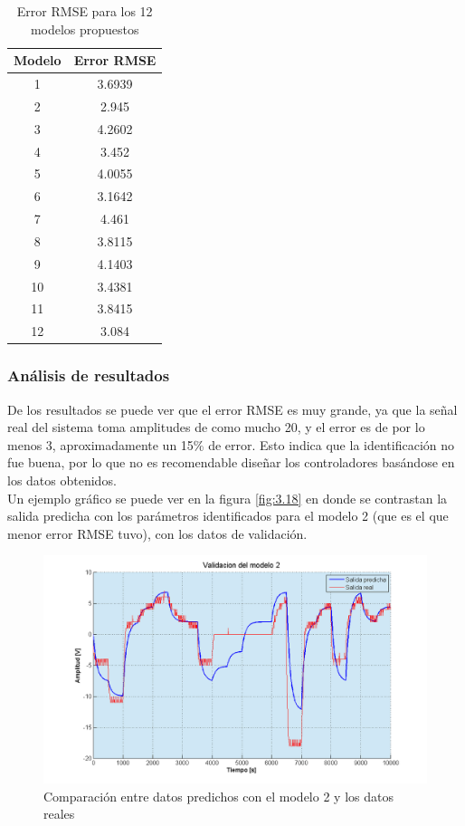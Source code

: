 \begin{table}[!ht]
	\begin{center}
		
		\begin{tabular}{|c|c|}
			\hline
			\rowcolor{OODlightblue}
			Modelo & Error RMSE   \\
			\hline \hline
			1 & 3.6939 \\
			\hline
			2 & 2.945 \\
			\hline
			3 & 4.2602  \\
			\hline
			4 & 3.452  \\
			\hline
			5 & 4.0055 \\
			\hline
			6 & 3.1642 \\
			\hline
			7 & 4.461 \\
			\hline
			8 & 3.8115 \\
			\hline
			9 & 4.1403 \\
			\hline
			10 & 3.4381 \\
			\hline
			11 & 3.8415 \\
			\hline
			12 & 3.084 \\
			\hline
		\end{tabular}
	\end{center}
	\caption{Error RMSE para los 12 modelos propuestos}
	\label{table:\thetable}
\end{table}

\subsubsection{Análisis de resultados}
De los resultados se puede ver que el error RMSE es muy grande, ya que la señal real del sistema toma amplitudes de como mucho 20, y el error es de por lo menos 3, aproximadamente un 15\% de error. Esto indica que la identificación no fue buena, por lo que no es recomendable diseñar los controladores basándose en los datos obtenidos. \\
Un ejemplo gráfico se puede ver en la figura \ref{fig:3.18} en donde se contrastan la salida predicha con los parámetros identificados para el modelo 2 (que es el que menor error RMSE tuvo), con los datos de validación.

\begin{figure}[!ht]
	\centering
	\includegraphics[width=15cm,scale=1]{resources/3_18-identVsValid.png}
	\caption{Comparación entre datos predichos con el modelo 2 y los datos reales}
	\label{fig:\thefigure}
\end{figure}


